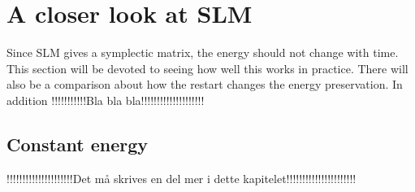 \section{A closer look at SLM }%

Since SLM gives a symplectic matrix, the energy should not change with time. This section will be devoted to seeing how well this works in practice. There will also be a comparison about how the restart changes the energy preservation. In addition 
!!!!!!!!!!!Bla bla bla!!!!!!!!!!!!!!!!!!!!\\



\subsection{Constant energy} \label{sec:SLMconstant}%
!!!!!!!!!!!!!!!!!!!!!Det må skrives en del mer i dette kapitelet!!!!!!!!!!!!!!!!!!!!!!\\

